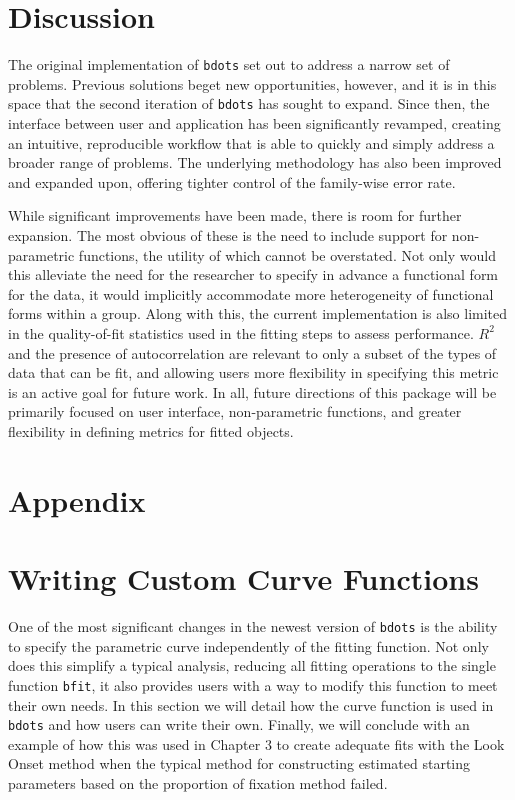 \documentclass{article}
\newcommand{\xt}{\texttt}%
\begin{document}
\section{Discussion}


The original implementation of \xt{bdots} set out to address a narrow set of problems. Previous solutions beget new opportunities, however, and it is in this space that the second iteration of \xt{bdots} has sought to expand. Since then, the interface between user and application has been significantly revamped, creating an intuitive, reproducible workflow that is able to quickly and simply address a broader range of problems. The underlying methodology has also been improved and expanded upon, offering tighter control of the family-wise error rate.

While significant improvements have been made, there is room for further expansion. The most obvious of these is the need to include support for non-parametric functions, the utility of which cannot be overstated. Not only would this alleviate the need for the researcher to specify in advance a functional form for the data, it would implicitly accommodate more heterogeneity of functional forms within a group. Along with this, the current implementation is also limited in the quality-of-fit statistics used in the fitting steps to assess performance. $R^2$ and the presence of autocorrelation are relevant to only a subset of the types of data that can be fit, and allowing users more flexibility in specifying this metric is an active goal for future work. In all, future directions of this package will be primarily focused on user interface, non-parametric functions, and greater flexibility in defining metrics for fitted objects.



\section*{Appendix}




\section{Writing Custom Curve Functions}

One of the most significant changes in the newest version of \xt{bdots} is the ability to specify the parametric curve independently of the fitting function. Not only does this simplify a typical analysis, reducing all fitting operations to the single function \xt{bfit}, it also provides users with a way to modify this function to meet their own needs. In this section we will detail how the curve function is used in \xt{bdots} and how users can write their own. Finally, we will conclude with an example of how this was used in Chapter 3 to create adequate fits with the Look Onset method when the typical method for constructing estimated starting parameters based on the proportion of fixation method failed.
\end{document}
